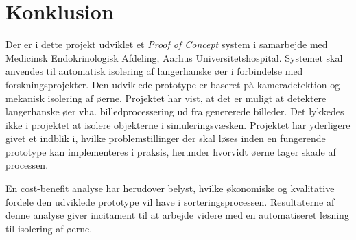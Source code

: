 \chapter{Konklusion}
Der er i dette projekt udviklet et \textit{Proof of Concept} system i samarbejde med Medicinsk Endokrinologisk Afdeling, Aarhus Universitetshospital. Systemet skal anvendes til automatisk isolering af langerhanske øer i forbindelse med forskningsprojekter. Den udviklede prototype er baseret på kameradetektion og mekanisk isolering af øerne. Projektet har vist, at det er muligt at detektere langerhanske øer vha. billedprocessering ud fra genererede billeder. Det lykkedes ikke i projektet at isolere objekterne i simuleringsvæsken. Projektet har yderligere givet et indblik i, hvilke problemstillinger der skal løses inden en fungerende prototype kan implementeres i praksis, herunder hvorvidt øerne tager skade af processen. 

En cost-benefit analyse har herudover belyst, hvilke økonomiske og kvalitative fordele den udviklede prototype vil have i sorteringsprocessen. Resultaterne af denne analyse giver incitament til at arbejde videre med en automatiseret løsning til isolering af øerne. 

